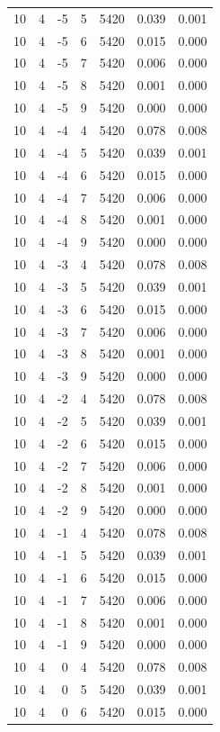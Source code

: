 \begin{table}
\begin{tabular}{rrrrrrr}
10 & 4 & -5 & 5 & 5420 & 0.039 & 0.001 \\
10 & 4 & -5 & 6 & 5420 & 0.015 & 0.000 \\
10 & 4 & -5 & 7 & 5420 & 0.006 & 0.000 \\
10 & 4 & -5 & 8 & 5420 & 0.001 & 0.000 \\
10 & 4 & -5 & 9 & 5420 & 0.000 & 0.000 \\
10 & 4 & -4 & 4 & 5420 & 0.078 & 0.008 \\
10 & 4 & -4 & 5 & 5420 & 0.039 & 0.001 \\
10 & 4 & -4 & 6 & 5420 & 0.015 & 0.000 \\
10 & 4 & -4 & 7 & 5420 & 0.006 & 0.000 \\
10 & 4 & -4 & 8 & 5420 & 0.001 & 0.000 \\
10 & 4 & -4 & 9 & 5420 & 0.000 & 0.000 \\
10 & 4 & -3 & 4 & 5420 & 0.078 & 0.008 \\
10 & 4 & -3 & 5 & 5420 & 0.039 & 0.001 \\
10 & 4 & -3 & 6 & 5420 & 0.015 & 0.000 \\
10 & 4 & -3 & 7 & 5420 & 0.006 & 0.000 \\
10 & 4 & -3 & 8 & 5420 & 0.001 & 0.000 \\
10 & 4 & -3 & 9 & 5420 & 0.000 & 0.000 \\
10 & 4 & -2 & 4 & 5420 & 0.078 & 0.008 \\
10 & 4 & -2 & 5 & 5420 & 0.039 & 0.001 \\
10 & 4 & -2 & 6 & 5420 & 0.015 & 0.000 \\
10 & 4 & -2 & 7 & 5420 & 0.006 & 0.000 \\
10 & 4 & -2 & 8 & 5420 & 0.001 & 0.000 \\
10 & 4 & -2 & 9 & 5420 & 0.000 & 0.000 \\
10 & 4 & -1 & 4 & 5420 & 0.078 & 0.008 \\
10 & 4 & -1 & 5 & 5420 & 0.039 & 0.001 \\
10 & 4 & -1 & 6 & 5420 & 0.015 & 0.000 \\
10 & 4 & -1 & 7 & 5420 & 0.006 & 0.000 \\
10 & 4 & -1 & 8 & 5420 & 0.001 & 0.000 \\
10 & 4 & -1 & 9 & 5420 & 0.000 & 0.000 \\
10 & 4 & 0 & 4 & 5420 & 0.078 & 0.008 \\
10 & 4 & 0 & 5 & 5420 & 0.039 & 0.001 \\
10 & 4 & 0 & 6 & 5420 & 0.015 & 0.000 \\

\end{tabular}
\end{table}
